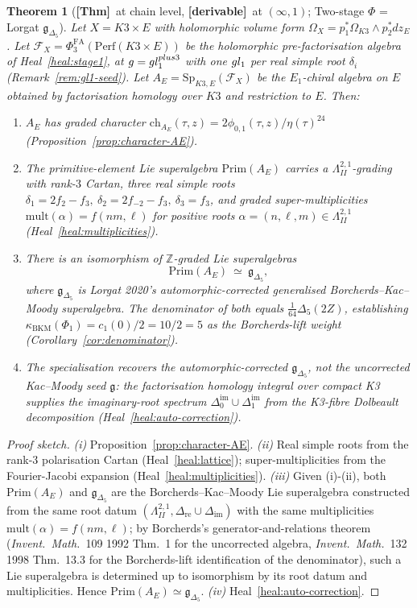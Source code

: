 \documentclass[11pt]{amsart}
\providecommand{\Z}{\mathbb{Z}}
\providecommand{\cF}{\mathcal{F}}
\providecommand{\Perf}{\mathrm{Perf}}
\providecommand{\fg}{\mathfrak{g}}
\providecommand{\frakg}{\mathfrak{g}}
\providecommand{\gDelta}{\mathfrak{g}_{\Delta_5}}
\providecommand{\Lat}{\Lambda}
\providecommand{\Sp}{\mathrm{Sp}}
\providecommand{\Prim}{\mathrm{Prim}}
\providecommand{\mult}{\mathrm{mult}}
\providecommand{\kBKM}{\kappa_{\mathrm{BKM}}}
\providecommand{\ClaimStatusTheorem}{\textbf{[Thm]}}
\providecommand{\ClaimStatusDerivation}{\textbf{[derivable]}}
\theoremstyle{plain}
\newtheorem{theorem}{Theorem}[section]
\theoremstyle{definition}
\theoremstyle{remark}
\begin{document}
\begin{theorem}[\ClaimStatusTheorem\ at chain level, \ClaimStatusDerivation\
  at $(\infty,1)$; Two-stage $\Phi$ = Lorgat $\gDelta$]
\label{thm:two-stage-lorgat}
Let $X=K3\times E$ with holomorphic volume form $\Omega_X=p_1^\ast
\Omega_{K3}\wedge p_2^\ast dz_E$. Let
$\cF_X=\Phi^{\mathrm{FA}}_3(\Perf(K3\times E))$ be the holomorphic
pre-factorisation algebra of Heal~\ref{heal:stage1}, at
$\frakg=\fgl_1^{\oplus 3}$ with one $gl_1$ per real simple root
$\delta_i$ (Remark~\ref{rem:gl1-seed}). Let $A_E=\Sp_{K3,E}(\cF_X)$ be
the $E_1$-chiral algebra on $E$ obtained by factorisation homology over
$K3$ and restriction to $E$. Then:
\begin{enumerate}[leftmargin=1.5em,label=\textup{(\roman*)},itemsep=2pt]
\item $A_E$ has graded character
$\mathrm{ch}_{A_E}(\tau,z)=2\phi_{0,1}(\tau,z)/\eta(\tau)^{24}$
(Proposition~\ref{prop:character-AE}).
\item The primitive-element Lie superalgebra $\Prim(A_E)$ carries a
$\Lat^{2,1}_{II}$-grading with rank-$3$ Cartan, three real simple
roots $\delta_1=2f_2-f_3,\ \delta_2=2f_{-2}-f_3,\ \delta_3=f_3$, and
graded super-multiplicities $\mult(\alpha)=f(nm,\ell)$ for positive
roots $\alpha=(n,\ell,m)\in\Lat^{2,1}_{II}$ (Heal~\ref{heal:multiplicities}).
\item There is an isomorphism of $\Z$-graded Lie superalgebras
\[
\Prim(A_E)\ \simeq\ \gDelta,
\]
where $\gDelta$ is Lorgat 2020's automorphic-corrected generalised
Borcherds--Kac--Moody superalgebra. The denominator of both equals
$\tfrac{1}{64}\Delta_5(2Z)$, establishing
$\kBKM(\Phi_1)=c_1(0)/2=10/2=5$ as the Borcherds-lift weight
(Corollary~\ref{cor:denominator}).
\item The specialisation recovers the automorphic-corrected
$\gDelta$, not the uncorrected Kac--Moody seed $\fg$: the factorisation
homology integral over compact K3 supplies the imaginary-root spectrum
$\Delta^{\mathrm{im}}_0\cup\Delta^{\mathrm{im}}_1$ from the K3-fibre
Dolbeault decomposition (Heal~\ref{heal:auto-correction}).
\end{enumerate}
\end{theorem}

\begin{proof}[Proof sketch]
\emph{(i)} Proposition~\ref{prop:character-AE}. \emph{(ii)} Real simple
roots from the rank-$3$ polarisation Cartan
(Heal~\ref{heal:lattice}); super-multiplicities from the Fourier-Jacobi
expansion (Heal~\ref{heal:multiplicities}). \emph{(iii)} Given
(i)-(ii), both $\Prim(A_E)$ and $\gDelta$ are the
Borcherds--Kac--Moody Lie superalgebra constructed from the same root
datum $(\Lat^{2,1}_{II},\Delta_{\mathrm{re}}\cup\Delta_{\mathrm{im}})$
with the same multiplicities $\mult(\alpha)=f(nm,\ell)$; by Borcherds's
generator-and-relations theorem (\emph{Invent.~Math.}~109 1992 Thm.~1
for the uncorrected algebra, \emph{Invent.~Math.}~132 1998 Thm.~13.3
for the Borcherds-lift identification of the denominator), such a Lie
superalgebra is determined up to isomorphism by its root datum and
multiplicities. Hence $\Prim(A_E)\simeq\gDelta$. \emph{(iv)}
Heal~\ref{heal:auto-correction}.
\end{proof}
\end{document}
